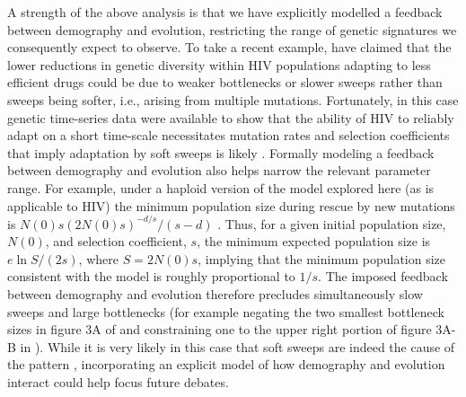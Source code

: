\documentclass[]{article}
\begin{document}
A strength of the above analysis is that we have explicitly modelled a feedback between demography and evolution, restricting the range of genetic signatures we consequently expect to observe. 
To take a recent example, \cite{harris2018unfounded} have claimed that the lower reductions in genetic diversity within HIV populations adapting to less efficient drugs \citep[as observed by][]{feder2016more} could be due to weaker bottlenecks or slower sweeps rather than sweeps being softer, i.e., arising from multiple mutations. Fortunately, in this case genetic time-series data were available to show that the ability of HIV to reliably adapt on a short time-scale necessitates mutation rates and selection coefficients that imply adaptation by soft sweeps is likely \citep{feder2018clarifying}. 
Formally modeling a feedback between demography and evolution also helps narrow the relevant parameter range.
For example, under a haploid version of the model explored here (as is applicable to HIV) the minimum population size during rescue by new mutations is $N(0) s (2N(0)s)^{-d/s} / (s-d)$ \citep[equation 22 in][]{orr2014population}.
Thus, for a given initial population size, $N(0)$, and selection coefficient, $s$, the minimum expected population size is $e \ln S / (2s)$, where $S=2N(0)s$, implying that the minimum population size consistent with the model is roughly proportional to $1/s$.
The imposed feedback between demography and evolution therefore precludes simultaneously slow sweeps and large bottlenecks (for example negating the two smallest bottleneck sizes in figure 3A of \citealp{harris2018unfounded} and constraining one to the upper right portion of figure 3A-B in \citealp{feder2018clarifying}).
While it is very likely in this case that soft sweeps are indeed the cause of the pattern \citep{feder2018clarifying}, incorporating an explicit model of how demography and evolution interact could help focus future debates.
\end{document}

